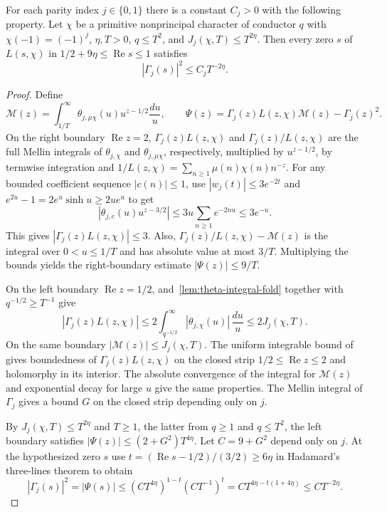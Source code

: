 \begin{lemma}
\label{lem:theta-three-lines}
\emitthmsource
For each parity index $j\in\{0,1\}$ there is a constant $C_j>0$ with the following property. Let $\chi$ be a primitive nonprincipal character of conductor $q$ with $\chi(-1)=(-1)^j$, $\eta,T>0$, $q\le T^2$, and $J_j(\chi,T)\le T^{2\eta}$. Then every zero $s$ of $L(s,\chi)$ in $1/2+9\eta\le\operatorname{Re}s\le1$ satisfies
\[
 |\Gamma_j(s)|^2\le C_j T^{-2\eta}.
\]
\end{lemma}
\begin{proof}
Define
\[
 \mathcal M(z)=\int_{1/T}^\infty \theta_{j,\mu\chi}(u)u^{z-1/2}\frac{du}{u},
 \qquad
 \Psi(z)=\Gamma_j(z)L(z,\chi)\mathcal M(z)-\Gamma_j(z)^2.
\]
On the right boundary $\operatorname{Re}z=2$, $\Gamma_j(z)L(z,\chi)$ and $\Gamma_j(z)/L(z,\chi)$ are the full Mellin integrals of $\theta_{j,\chi}$ and $\theta_{j,\mu\chi}$, respectively, multiplied by $u^{z-1/2}$, by termwise integration and $1/L(z,\chi)=\sum_{n\ge1}\mu(n)\chi(n)n^{-z}$. For any bounded coefficient sequence $|c(n)|\le1$, use $|w_j(t)|\le3e^{-2t}$ and $e^{2u}-1=2e^u\sinh u\ge2ue^u$ to get
\[
 |\theta_{j,c}(u)u^{z-3/2}|
 \le 3u\sum_{n\ge1}e^{-2nu}\le 3e^{-u}.
\]
This gives $|\Gamma_j(z)L(z,\chi)|\le3$. Also, $\Gamma_j(z)/L(z,\chi)-\mathcal M(z)$ is the integral over $0<u\le1/T$ and has absolute value at most $3/T$. Multiplying the bounds yields the right-boundary estimate $|\Psi(z)|\le9/T$.

On the left boundary $\operatorname{Re}z=1/2$,  and~\ref{lem:theta-integral-fold} together with $q^{-1/2}\ge T^{-1}$ give
\[
 |\Gamma_j(z)L(z,\chi)|
 \le 2\int_{q^{-1/2}}^\infty|\theta_{j,\chi}(u)|\,\frac{du}{u}
 \le 2J_j(\chi,T).
\]
On the same boundary $|\mathcal M(z)|\le J_j(\chi,T)$. The uniform integrable bound of  gives boundedness of $\Gamma_j(z)L(z,\chi)$ on the closed strip $1/2\le\operatorname{Re}z\le2$ and holomorphy in its interior. The absolute convergence of the integral for $\mathcal M(z)$ and exponential decay for large $u$ give the same properties. The Mellin integral of $\Gamma_j$ gives a bound $G$ on the closed strip depending only on $j$.

By $J_j(\chi,T)\le T^{2\eta}$ and $T\ge1$, the latter from $q\ge1$ and $q\le T^2$, the left boundary satisfies $|\Psi(z)|\le (2+G^2)T^{4\eta}$. Let $C=9+G^2$ depend only on $j$. At the hypothesized zero $s$ use $t=(\operatorname{Re}s-1/2)/(3/2)\ge6\eta$ in Hadamard's three-lines theorem to obtain
\[
 |\Gamma_j(s)|^2=|\Psi(s)|
 \le (CT^{4\eta})^{1-t}(CT^{-1})^t
 =CT^{4\eta-t(1+4\eta)}\le CT^{-2\eta}.
\]
\end{proof}

